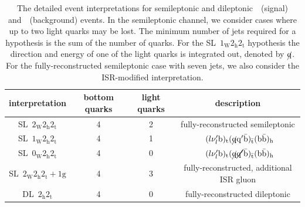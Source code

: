 \begin{table}[h!]
\begin{center}
\begin{tabular}{c|ccc}
\hline
interpretation & bottom quarks & light quarks & description \\
\hline
SL~$2_{\mathrm{W}} 2_{\mathrm{h}} 2_{\mathrm{t}}$ & 4 & 2 & fully-reconstructed semileptonic \\
SL~$1_{\mathrm{W}} 2_{\mathrm{h}} 2_{\mathrm{t}}$ & 4 & 1 &~$(l \nu_{l}' \mathrm{b})_{\mathrm{t}} (\cancel{\mathrm{q}} \mathrm{q}' \bar{\mathrm{b}})_{\bar{\mathrm{t}}} (\mathrm{b} \bar{\mathrm{b}})_{\mathrm{h}}$ \\
SL~$0_{\mathrm{W}} 2_{\mathrm{h}} 2_{\mathrm{t}}$ & 4 & 0 &~$(l \nu_{l}' \mathrm{b})_{\mathrm{t}} (\cancel{\mathrm{q}} \cancel{\mathrm{q}'} \bar{\mathrm{b}})_{\bar{\mathrm{t}}} (\mathrm{b} \bar{\mathrm{b}})_{\mathrm{h}}$ \\
SL~$2_{\mathrm{W}} 2_{\mathrm{h}} 2_{\mathrm{t}}+1\mathrm{g}$ & 4 & 3 & fully-reconstructed, additional ISR gluon \\
\hline
DL~$2_{\mathrm{h}} 2_{\mathrm{t}}$ & 4 & 0 & fully-reconstructed dileptonic \\
\hline
\hline
\end{tabular}
\caption[The MEM event interpretations considered for different final state topologies]{The detailed event interpretations for semileptonic and dileptonic~\ttH~(signal) and~\ttbb~(background) events. In the semileptonic channel, we consider cases where up to two light quarks may be lost. The minimum number of jets required for a hypothesis is the sum of the number of quarks. For the SL~$1_{\mathrm{W}} 2_{\mathrm{h}} 2_{\mathrm{t}}$ hypothesis the direction and energy of one of the light quarks is integrated out, denoted by $\cancel{\mathrm{q}}$. For the fully-reconstructed semileptonic case with seven jets, we also consider the ISR-modified interpretation.}
\label{tab:event_interpretation_list}
\end{center}
\end{table}

